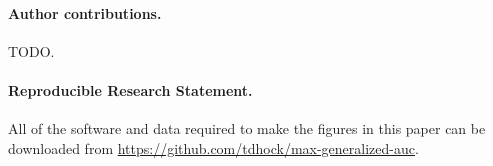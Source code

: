 \documentclass{article}
\begin{document}
\paragraph{Author contributions.} TODO. 

\paragraph{Reproducible Research Statement.} All of the software and data required to make the figures in this paper can be downloaded from \url{https://github.com/tdhock/max-generalized-auc}. 







\end{document}
